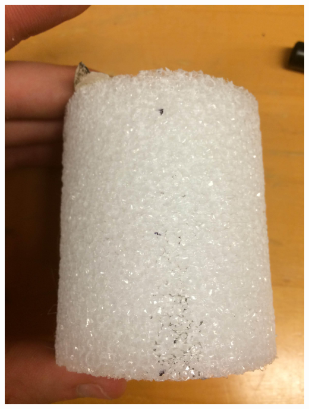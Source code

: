\documentclass[11pt]{article} %
\begin{document}
\begin{center}
\includegraphics[scale=0.08]{feed/10.jpeg}
\end{center}
\end{document}
